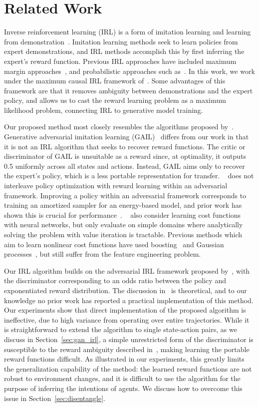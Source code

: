 \documentclass{article} \usepackage{iclr2018_conference,times}
\begin{document}
\section{Related Work}
Inverse reinforcement learning (IRL) is a form of imitation learning and learning from demonstration~\citep{Argall09}. Imitation learning methods seek to learn policies from expert demonstrations, and IRL methods accomplish this by first inferring the expert's reward function. Previous IRL approaches have included maximum margin approaches~\citep{Abbeel04, Ratliff06}, and probabilistic approaches such as~\citet{Ziebart08,Boularias11}. In this work, we work under the maximum causal IRL framework of~\citet{Ziebart10}. Some advantages of this framework are that it removes ambiguity between demonstrations and the expert policy, and allows us to cast the reward learning problem as a maximum likelihood problem, connecting IRL to generative model training.

Our proposed method most closely resembles the algorithms proposed by~\citet{Uchibe17,Ho16b,Finn16b}. Generative adversarial imitation learning (GAIL)~\citep{Ho16b} differs from our work in that it is not an IRL algorithm that seeks to recover reward functions. The critic or discriminator of GAIL is unsuitable as a reward since, at optimality, it outputs 0.5 uniformly across all states and actions. Instead, GAIL aims only to recover the expert's policy, which is a less portable representation for transfer. ~\citet{Uchibe17} does not interleave policy optimization with reward learning within an adversarial framework. Improving a policy within an adversarial framework corresponds to training an amortized sampler for an energy-based model, and prior work has shown this is crucial for performance~\citep{Finn16a}. ~\citet{Wulfmeier15} also consider learning cost functions with neural networks, but only evaluate on simple domains where analytically solving the problem with value iteration is tractable. Previous methods which aim to learn nonlinear cost functions have used boosting~\citep{Ratliff07} and Gaussian processes~\citep{Levine11}, but still suffer from the feature engineering problem.

Our IRL algorithm builds on the adversarial IRL framework proposed by~\citet{Finn16b}, with the discriminator corresponding to an odds ratio between the policy and exponentiated reward distribution. The discussion in~\citet{Finn16b} is theoretical, and to our knowledge no prior work has reported a practical implementation of this method. Our experiments show that direct implementation of the proposed algorithm is ineffective, due to high variance from operating over entire trajectories. While it is straightforward to extend the algorithm to single state-action pairs, as we discuss in Section~\ref{sec:gan_irl}, a simple unrestricted form of the discriminator is susceptible to the reward ambiguity described in~\citep{Ng1999}, making learning the portable reward functions difficult. As illustrated in our experiments, this greatly limits the generalization capability of the method: the learned reward functions are not robust to environment changes, and it is difficult to use the algorithm for the purpose of inferring the intentions of agents. We discuss how to overcome this issue in Section~\ref{sec:disentangle}.
\end{document}
